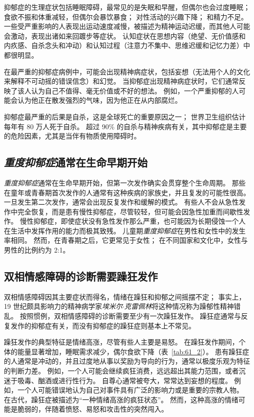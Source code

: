 抑郁症的生理症状包括睡眠障碍，最常见的是失眠和早醒，但偶尔也会过度睡眠；
食欲不振和体重减轻，但偶尔会暴饮暴食；
对性活动的兴趣下降；
和精力不足。
一些受严重影响的人表现出运动速度减慢，被描述为精神运动迟缓，而其他人可能会激动，表现出诸如来回踱步等症状。
认知症状在思想内容（绝望、无价值感和内疚感、自杀念头和冲动）和认知过程（注意力不集中、思维迟缓和记忆力差）中都很明显。


在最严重的抑郁症病例中，可能会出现精神病症状，包括妄想（无法用个人的文化来解释不可动摇的错误信念）和幻觉。
当抑郁症出现精神病症状时，它们通常反映了该人认为自己不值得、毫无价值或不好的想法。
例如，一个严重抑郁的人可能会认为他正在散发强烈的气味，因为他正在从内部腐烂。


抑郁症最严重的后果是自杀，这是全球死亡的重要原因之一；
世界卫生组织估计每年有 80 万人死于自杀。
超过 90\% 的自杀与精神疾病有关，其中抑郁症是主要的危险因素，尤其是当伴有物质使用障碍时。



\subsection{\textit{重度抑郁症}通常在生命早期开始}

\textit{重度抑郁症}通常在生命早期开始，但第一次发作确实会贯穿整个生命周期。
那些在童年或青春期首次发作的人通常有这种疾病的家族史，并且复发的可能性很高。
一旦发生第二次发作，通常会出现反复发作和缓解的模式。
有些人不会从急性发作中完全恢复，而是患有慢性抑郁症，尽管较轻，但可能会因急性加重而间歇性发作。
慢性抑郁症，即使症状没有急性发作那么严重，也可能因为长期侵蚀一个人在生活中发挥作用的能力而极其致残。
儿童期\textit{重度抑郁症}在男性和女性中的发生率相同。
然而，在青春期之后，它更常见于女性；
在不同国家和文化中，女性与男性的比例约为 2:1。



\subsection{双相情感障碍的诊断需要躁狂发作}

双相情感障碍因其主要症状而得名，情绪在躁狂和抑郁之间摇摆不定；
事实上，19 世纪颇具影响力的精神病学家\textit{埃米尔$\cdot$克雷佩林}将这种情况称为躁郁性精神错乱。
按照惯例，双相情感障碍的诊断需要至少有一次躁狂发作。
躁狂症通常与反复发作的抑郁症有关，而没有抑郁症的躁狂症则基本上不常见。


躁狂发作的典型特征是情绪高涨，尽管有些人主要是易怒。
在躁狂发作期间，个体的能量显著增加，睡眠需求减少，偶尔食欲下降（表~\ref{tab:61_2}）。
患有躁狂症的人通常是冲动的，并且过度地从事以奖励为导向的行为，通常以极度乐观为特征的判断力差。
例如，一个人可能会继续疯狂消费，远远超出其能力范围，或者沉迷于吸毒、酗酒或进行性行为。
自尊心通常被夸大，常常达到妄想的程度。
例如，一个人可能错误地认为自己对事件具有广泛的影响力或是重要的宗教人物。
在古代，躁狂症被描述为“一种情绪高涨的疯狂状态”。
然而，这种高涨的情绪可能是脆弱的，伴随着愤怒、易怒和攻击性的突然闯入。


